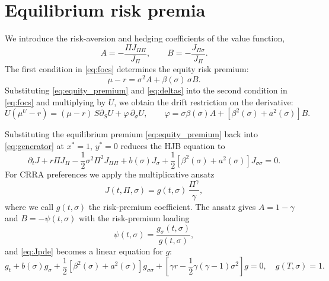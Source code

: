 \documentclass[11pt]{article}
\theoremstyle{remark}
\begin{document}
\section{Equilibrium risk premia}\label{sec:premia}

We introduce the risk-aversion and hedging coefficients of the value function,
\begin{equation}\label{eq:AB}
A = - \frac{\Pi J_{\Pi \Pi}}{J_{\Pi}}, \qquad B= -\frac{J_{\Pi\sigma}}{J_{\Pi}}.
\end{equation}
The first condition in \eqref{eq:focs} determines the equity risk premium:
\begin{equation}\label{eq:equity_premium}
\mu-r = \sigma^{2}A + \beta(\sigma)\, \sigma B.
\end{equation}
Substituting \eqref{eq:equity_premium} and \eqref{eq:deltas} into the second condition in \eqref{eq:focs} and multiplying by $U$, we obtain the drift restriction on the derivative:
\begin{equation}\label{eq:U_premium}
U (\mu^{U} - r)  = (\mu-r)\,S\partial_{S}U + \varphi\, \partial_{\sigma}U,
\qquad
\varphi = \sigma\beta(\sigma) A + \left[ \beta^{2}(\sigma)  + a^{2}(\sigma) \right]B.
\end{equation}

Substituting the equilibrium premium \eqref{eq:equity_premium} back into \eqref{eq:generator} at $x^{*}=1$, $y^{*}=0$ reduces the HJB equation to
\begin{equation}\label{eq:Jpde}
\partial_{t} J + r\Pi J_{\Pi} - \frac{1}{2}\sigma^{2}\Pi^{2} J_{\Pi\Pi} +  b(\sigma)J_{\sigma} +\frac{1}{2}\left[\beta^{2}(\sigma) + a^{2}(\sigma)\right]J_{\sigma\sigma} = 0.
\end{equation}
For CRRA preferences we apply the multiplicative ansatz
\begin{equation}\label{eq:ansatz}
J(t,\Pi,\sigma) = g(t, \sigma)\, \frac{\Pi^{\gamma}}{\gamma},
\end{equation}
where we call $g(t,\sigma)$ the risk-premium coefficient. The ansatz gives $A = 1-\gamma$ and $B = -\psi(t,\sigma)$ with the risk-premium loading
\begin{equation}\label{eq:psi}
\psi (t, \sigma) = \frac{g_{\sigma}(t, \sigma) }{g(t, \sigma) },
\end{equation}
and \eqref{eq:Jpde} becomes a linear equation for $g$:
\begin{equation}\label{eq:gpde}
g_{t} +  b(\sigma)g_{\sigma} +\frac{1}{2}\left[\beta^{2}(\sigma) + a^{2}(\sigma)\right]g_{\sigma\sigma} +  \left[\gamma r  - \frac{1}{2} \gamma (\gamma-1) \sigma^{2} \right]g  = 0, \quad g(T, \sigma) = 1.
\end{equation}
\end{document}
